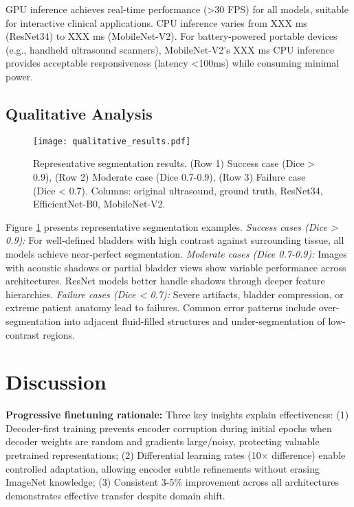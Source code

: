 \documentclass{article}
\begin{document}
GPU inference achieves real-time performance (>30 FPS) for all models, suitable for interactive clinical applications. CPU inference varies from XXX ms (ResNet34) to XXX ms (MobileNet-V2). For battery-powered portable devices (e.g., handheld ultrasound scanners), MobileNet-V2's XXX ms CPU inference provides acceptable responsiveness (latency <100ms) while consuming minimal power.

\subsection{Qualitative Analysis}

\begin{figure}[t]
\centering
\texttt{[image: qualitative\_results.pdf]}
\caption{Representative segmentation results. (Row 1) Success case (Dice > 0.9), (Row 2) Moderate case (Dice 0.7-0.9), (Row 3) Failure case (Dice < 0.7). Columns: original ultrasound, ground truth, ResNet34, EfficientNet-B0, MobileNet-V2.}
\label{fig:qualitative}
\end{figure}

Figure \ref{fig:qualitative} presents representative segmentation examples. \textit{Success cases (Dice > 0.9):} For well-defined bladders with high contrast against surrounding tissue, all models achieve near-perfect segmentation. \textit{Moderate cases (Dice 0.7-0.9):} Images with acoustic shadows or partial bladder views show variable performance across architectures. ResNet models better handle shadows through deeper feature hierarchies. \textit{Failure cases (Dice < 0.7):} Severe artifacts, bladder compression, or extreme patient anatomy lead to failures. Common error patterns include over-segmentation into adjacent fluid-filled structures and under-segmentation of low-contrast regions.

\section{Discussion}

\textbf{Progressive finetuning rationale:} Three key insights explain effectiveness: (1) Decoder-first training prevents encoder corruption during initial epochs when decoder weights are random and gradients large/noisy, protecting valuable pretrained representations; (2) Differential learning rates (10$\times$ difference) enable controlled adaptation, allowing encoder subtle refinements without erasing ImageNet knowledge; (3) Consistent 3-5\% improvement across all architectures demonstrates effective transfer despite domain shift.
\end{document}
